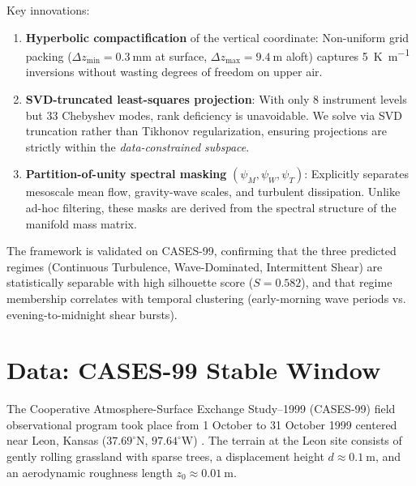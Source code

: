 \documentclass[11pt,a4paper]{article}
\begin{document}
Key innovations:
\begin{enumerate}
  \item \textbf{Hyperbolic compactification} of the vertical coordinate: Non-uniform grid packing ($\Delta z_{\min} = \SI{0.3}{\milli\meter}$ at surface, $\Delta z_{\max} = \SI{9.4}{\meter}$ aloft) captures \SI{5}{\kelvin\per\meter} inversions without wasting degrees of freedom on upper air.
  \item \textbf{SVD-truncated least-squares projection}: With only 8 instrument levels but 33 Chebyshev modes, rank deficiency is unavoidable. We solve via SVD truncation rather than Tikhonov regularization, ensuring projections are strictly within the \emph{data-constrained subspace}.
  \item \textbf{Partition-of-unity spectral masking} $(\psi_M, \psi_W, \psi_T)$: Explicitly separates mesoscale mean flow, gravity-wave scales, and turbulent dissipation. Unlike ad-hoc filtering, these masks are derived from the spectral structure of the manifold mass matrix.
\end{enumerate}

The framework is validated on CASES-99, confirming that the three predicted regimes (Continuous Turbulence, Wave-Dominated, Intermittent Shear) are statistically separable with high silhouette score ($S = 0.582$), and that regime membership correlates with temporal clustering (early-morning wave periods vs. evening-to-midnight shear bursts).

\section{Data: CASES-99 Stable Window}
\label{sec:data}

The Cooperative Atmosphere-Surface Exchange Study--1999 (CASES-99) field observational program took place from 1 October to 31 October 1999 centered near Leon, Kansas ($37.69^\circ\text{N}$, $97.64^\circ\text{W}$) \citep{Poulos2002}. The terrain at the Leon site consists of gently rolling grassland with sparse trees, a displacement height $d \approx \SI{0.1}{\meter}$, and an aerodynamic roughness length $z_0 \approx \SI{0.01}{\meter}$.
\end{document}
